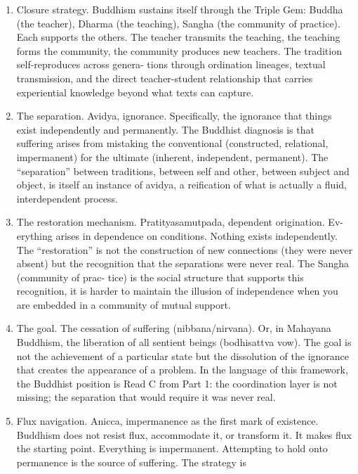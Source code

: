 \documentclass[
]{article}
\providecommand{\tightlist}{%
  \setlength{\itemsep}{0pt}\setlength{\parskip}{0pt}}
\begin{document}
\begin{enumerate}
\def\labelenumi{\arabic{enumi}.}
\setcounter{enumi}{35}
\tightlist
\item
  Closure strategy. Buddhism sustains itself through the Triple Gem:
  Buddha (the teacher), Dharma (the teaching), Sangha (the community of
  practice). Each supports the others. The teacher transmits the
  teaching, the teaching forms the community, the community produces new
  teachers. The tradition self-reproduces across genera- tions through
  ordination lineages, textual transmission, and the direct
  teacher-student relationship that carries experiential knowledge
  beyond what texts can capture.
\item
  The separation. Avidya, ignorance. Specifically, the ignorance that
  things exist independently and permanently. The Buddhist diagnosis is
  that suffering arises from mistaking the conventional (constructed,
  relational, impermanent) for the ultimate (inherent, independent,
  permanent). The ``separation'' between traditions, between self and
  other, between subject and object, is itself an instance of avidya, a
  reification of what is actually a fluid, interdependent process.
\item
  The restoration mechanism. Pratityasamutpada, dependent origination.
  Ev- erything arises in dependence on conditions. Nothing exists
  independently. The ``restoration'' is not the construction of new
  connections (they were never absent) but the recognition that the
  separations were never real. The Sangha (community of prac- tice) is
  the social structure that supports this recognition, it is harder to
  maintain the illusion of independence when you are embedded in a
  community of mutual support.
\item
  The goal. The cessation of suffering (nibbana/nirvana). Or, in
  Mahayana Buddhism, the liberation of all sentient beings (bodhisattva
  vow). The goal is not the achievement of a particular state but the
  dissolution of the ignorance that creates the appearance of a problem.
  In the language of this framework, the Buddhist position is Read C
  from Part 1: the coordination layer is not missing; the separation
  that would require it was never real.
\item
  Flux navigation. Anicca, impermanence as the first mark of existence.
  Buddhism does not resist flux, accommodate it, or transform it. It
  makes flux the starting point. Everything is impermanent. Attempting
  to hold onto permanence is the source of suffering. The strategy is

\end{enumerate}
\end{document}
